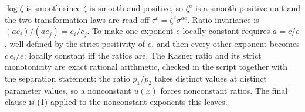 $\log \zeta$ is smooth since $\zeta$ is smooth and positive, so $\zeta^{e}$ is a smooth positive unit and the two transformation laws are read off $\tau^{e} = \zeta^{e}\sigma^{ae}$. Ratio invariance is $(a e_i)/(a e_j) = e_i/e_j$. To make one exponent $e$ locally constant requires $a = c/e$, well defined by the strict positivity of $e$, and then every other exponent becomes $c\,e_i/e$: locally constant iff the ratios are. The Kasner ratio and its strict monotonicity are exact rational arithmetic, checked in the script together with the separation statement: the ratio $p_1/p_2$ takes distinct values at distinct parameter values, so a nonconstant $u(x)$ forces nonconstant ratios. The final clause is (1) applied to the nonconstant exponents this leaves.
